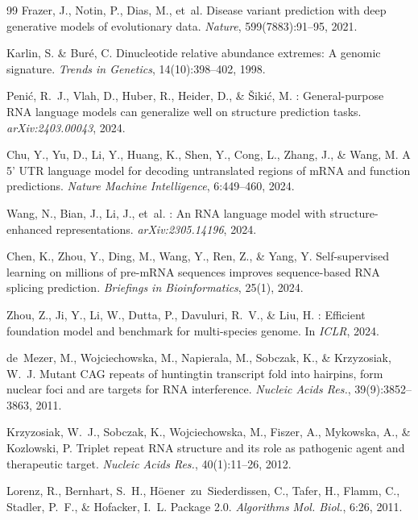 \documentclass[11pt]{article}
\begin{document}
\begin{thebibliography}{99}
Frazer, J., Notin, P., Dias, M., et~al.
\newblock Disease variant prediction with deep generative models
  of evolutionary data.
\newblock \emph{Nature}, 599(7883):91--95, 2021.

Karlin, S. \& Bur\'{e}, C.
\newblock Dinucleotide relative abundance extremes: A genomic
  signature.
\newblock \emph{Trends in Genetics}, 14(10):398--402, 1998.

Peni\'{c}, R.~J., Vlah, D., Huber, R., Heider, D., \&
  \v{S}iki\'{c}, M.
: General-purpose {RNA} language models can
  generalize well on structure prediction tasks.
\newblock \emph{arXiv:2403.00043}, 2024.

Chu, Y., Yu, D., Li, Y., Huang, K., Shen, Y., Cong, L.,
  Zhang, J., \& Wang, M.
\newblock A 5' {UTR} language model for decoding untranslated
  regions of {mRNA} and function predictions.
\newblock \emph{Nature Machine Intelligence}, 6:449--460, 2024.

Wang, N., Bian, J., Li, J., et~al.
: An {RNA} language model with structure-enhanced
  representations.
\newblock \emph{arXiv:2305.14196}, 2024.

Chen, K., Zhou, Y., Ding, M., Wang, Y., Ren, Z., \& Yang, Y.
\newblock Self-supervised learning on millions of pre-{mRNA} sequences
  improves sequence-based {RNA} splicing prediction.
\newblock \emph{Briefings in Bioinformatics}, 25(1), 2024.

Zhou, Z., Ji, Y., Li, W., Dutta, P., Davuluri, R.~V., \& Liu, H.
: Efficient foundation model and benchmark for
  multi-species genome.
\newblock In \emph{ICLR}, 2024.

de~Mezer, M., Wojciechowska, M., Napierala, M., Sobczak, K., \&
  Krzyzosiak, W.~J.
\newblock Mutant {CAG} repeats of huntingtin transcript fold into
  hairpins, form nuclear foci and are targets for {RNA} interference.
\newblock \emph{Nucleic Acids Res.}, 39(9):3852--3863, 2011.

Krzyzosiak, W.~J., Sobczak, K., Wojciechowska, M., Fiszer, A.,
  Mykowska, A., \& Kozlowski, P.
\newblock Triplet repeat {RNA} structure and its role as pathogenic
  agent and therapeutic target.
\newblock \emph{Nucleic Acids Res.}, 40(1):11--26, 2012.

Lorenz, R., Bernhart, S.~H., H\"oener~zu~Siederdissen, C.,
  Tafer, H., Flamm, C., Stadler, P.~F., \& Hofacker, I.~L.
 Package 2.0.
\newblock \emph{Algorithms Mol. Biol.}, 6:26, 2011.

\end{thebibliography}
\end{document}
